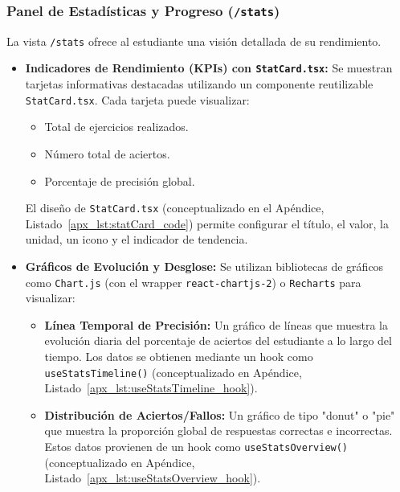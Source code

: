 \subsubsection{Panel de Estadísticas y Progreso (\texttt{/stats})}
\label{sssec:desarrollo_stats_page}

La vista \texttt{/stats} ofrece al estudiante una visión detallada de su rendimiento.
\begin{itemize}[leftmargin=*]
    \item \textbf{Indicadores de Rendimiento (KPIs) con \texttt{StatCard.tsx}:} Se muestran tarjetas informativas destacadas utilizando un componente reutilizable \texttt{StatCard.tsx}. Cada tarjeta puede visualizar:
        \begin{itemize}
          \item Total de ejercicios realizados.
          \item Número total de aciertos.
          \item Porcentaje de precisión global.
        \end{itemize}
        El diseño de \texttt{StatCard.tsx} (conceptualizado en el Apéndice, Listado~\ref{apx_lst:statCard_code}) permite configurar el título, el valor, la unidad, un icono y el indicador de tendencia.

    \item \textbf{Gráficos de Evolución y Desglose:} Se utilizan bibliotecas de gráficos como \texttt{Chart.js} (con el wrapper \texttt{react-chartjs-2}) o \texttt{Recharts} para visualizar:
        \begin{itemize}
          \item \textbf{Línea Temporal de Precisión:} Un gráfico de líneas que muestra la evolución diaria del porcentaje de aciertos del estudiante a lo largo del tiempo. Los datos se obtienen mediante un hook como \texttt{useStatsTimeline()} (conceptualizado en Apéndice, Listado~\ref{apx_lst:useStatsTimeline_hook}).
          \item \textbf{Distribución de Aciertos/Fallos:} Un gráfico de tipo "donut" o "pie" que muestra la proporción global de respuestas correctas e incorrectas. Estos datos provienen de un hook como \texttt{useStatsOverview()} (conceptualizado en Apéndice, Listado~\ref{apx_lst:useStatsOverview_hook}).
        \end{itemize}


\end{itemize}
